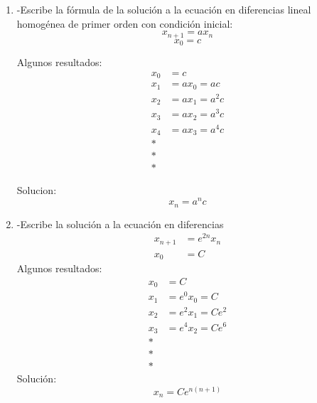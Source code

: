 \documentclass{article}
\begin{document}
\begin{enumerate}
\item-Escribe la fórmula de la solución a la ecuación en diferencias lineal homogénea de primer orden con condición inicial:
$$x_{n+1}=ax_{n}$$
$$x_{0}=c$$

Algunos resultados:
\begin{align*}
  x_{0}&=c\\
  x_1&=ax_0=ac\\
  x_2&=ax_1=a^{2}c\\
  x_3&=ax_2=a^{3}c\\
  x_4&=ax_3=a^{4}c\\
  *\\
  *\\
  *
\end{align*}

Solucion: $$x_{n}=a^{n}c$$

\item-Escribe la solución a la ecuación en diferencias
\begin{align*}
  x_{n+1}&=e^{2n}x_n\\
  x_0&=C
\end{align*}
Algunos resultados:
\begin{align*}
  x_0&=C\\
  x_1&=e^0x_0=C\\
  x_2&=e^2x_1=Ce^2\\
  x_3&=e^4x_2=Ce^6\\
  *\\
  *\\
  *
\end{align*}
Solución:
$$x_n=Ce^{n(n+1)}$$
\end{enumerate}
\end{document}
